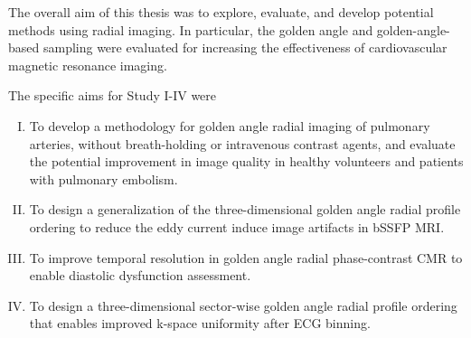 The overall aim of this thesis was to explore, evaluate, and develop potential methods using radial imaging. In particular, the golden angle and golden-angle-based sampling were evaluated for increasing the effectiveness of cardiovascular magnetic resonance imaging.

The specific aims for Study I-IV were
\begin{enumerate}[I.]
    \item To develop a methodology for golden angle radial imaging of pulmonary arteries, without breath-holding or intravenous contrast agents, and evaluate the potential improvement in image quality in healthy volunteers and patients with pulmonary embolism. 
    \item To design a generalization of the three-dimensional golden angle radial profile ordering to reduce the eddy current induce image artifacts in bSSFP MRI.
    \item To improve temporal resolution in golden angle radial phase-contrast CMR to enable diastolic dysfunction assessment.
    \item To design a three-dimensional sector-wise golden angle radial profile ordering that enables improved k-space uniformity after ECG binning.
\end{enumerate}